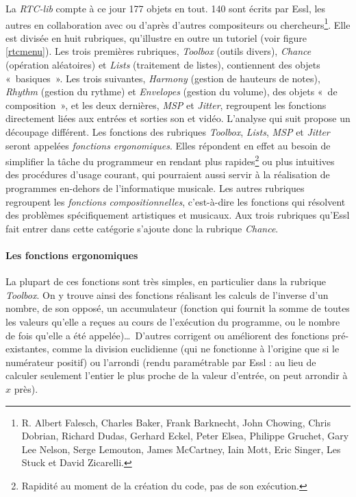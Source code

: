 \documentclass[a4paper,12pt]{article}
\newcommand{\guill}[1]{«~#1~»}
\begin{document}
La \emph{RTC-lib} compte à ce jour 177 objets en tout. 140 sont écrits par Essl, les autres en collaboration avec ou d'après d'autres compositeurs ou chercheurs\footnote{R. Albert Falesch, Charles Baker, Frank Barknecht, John Chowing, Chris Dobrian, Richard Dudas, Gerhard Eckel, Peter Elsea, Philippe Gruchet, Gary Lee Nelson, Serge Lemouton, James McCartney, Iain Mott, Eric Singer, Les Stuck et David Zicarelli.}. Elle est divisée en huit rubriques, qu'illustre en outre un tutoriel (voir figure \ref{rtcmenu}). Les trois premières rubriques, \emph{Toolbox} (outils divers), \emph{Chance} (opération aléatoires) et \emph{Lists} (traitement de listes), contiennent des objets \guill{basiques}. Les trois suivantes, \emph{Harmony} (gestion de hauteurs de notes), \emph{Rhythm} (gestion du rythme) et \emph{Envelopes} (gestion du volume), des objets \guill{de composition}, et les deux dernières, \emph{MSP} et \emph{Jitter}, regroupent les fonctions directement liées aux entrées et sorties son et vidéo. L'analyse qui suit propose un découpage différent. Les fonctions des rubriques \emph{Toolbox}, \emph{Lists}, \emph{MSP} et \emph{Jitter} seront appelées \emph{fonctions ergonomiques}. Elles répondent en effet au besoin de simplifier la tâche du programmeur en rendant plus rapides\footnote{Rapidité au moment de la création du code, pas de son exécution.} ou plus intuitives des procédures d'usage courant, qui pourraient aussi servir à la réalisation de programmes en-dehors de l'informatique musicale. Les autres rubriques regroupent les \emph{fonctions compositionnelles}, c'est-à-dire les fonctions qui résolvent des problèmes spécifiquement artistiques et musicaux. Aux trois rubriques qu'Essl fait entrer dans cette catégorie s'ajoute donc la rubrique \emph{Chance}.

\paragraph{Les fonctions ergonomiques \\}

La plupart de ces fonctions sont très simples, en particulier dans la rubrique \emph{Toolbox}. On y trouve ainsi des fonctions réalisant les calculs de l'inverse d'un nombre, de son opposé, un accumulateur (fonction qui fournit la somme de toutes les valeurs qu'elle a reçues au cours de l'exécution du programme, ou le nombre de fois qu'elle a été appelée)\dots~D'autres corrigent ou améliorent des fonctions pré-existantes, comme la division euclidienne (qui ne fonctionne à l'origine que si le numérateur positif) ou l'arrondi (rendu paramétrable par Essl : au lieu de calculer seulement l'entier le plus proche de la valeur d'entrée, on peut arrondir à $x$ près).
\end{document}
